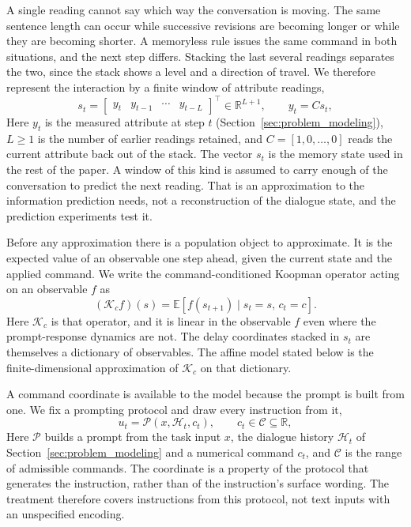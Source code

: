 A single reading cannot say which way the conversation is moving. The same
sentence length can occur while successive revisions are becoming longer or
while they are becoming shorter. A memoryless rule issues the same command in
both situations, and the next step differs. Stacking the last several readings
separates the two, since the stack shows a level and a direction of travel. We
therefore represent the interaction by a finite window of attribute readings,
\begin{equation}
    s_t=
    \begin{bmatrix}
        y_t & y_{t-1} & \cdots & y_{t-L}
    \end{bmatrix}^{\top}
    \in\mathbb{R}^{L+1},
    \qquad
    y_t=C s_t,
    \label{eq:memory_state}
\end{equation}
Here $y_t$ is the measured attribute at step $t$
(Section~\ref{sec:problem_modeling}), $L\geq 1$ is the number of earlier
readings retained, and $C=[1,0,\ldots,0]$ reads the current attribute back out
of the stack. The vector $s_t$ is the memory state used in the rest of the
paper. A window of this kind is assumed to carry enough of the conversation to
predict the next reading. That is an approximation to the information
prediction needs, not a reconstruction of the dialogue state, and the
prediction experiments test it.

Before any approximation there is a population object to approximate. It is
the expected value of an observable one step ahead, given the current state
and the applied command. We write the command-conditioned Koopman operator
acting on an observable $f$ as
\begin{equation}
    (\mathcal{K}_{c}f)(s)
    =
    \mathbb{E}\!\left[
        f(s_{t+1})
        \mid s_t=s,\,c_t=c
    \right].
    \label{eq:koopman_operator}
\end{equation}
Here $\mathcal{K}_{c}$ is that operator, and it is linear in the observable
$f$ even where the prompt-response dynamics are not. The delay coordinates
stacked in $s_t$ are themselves a dictionary of observables. The affine model
stated below is the finite-dimensional approximation of $\mathcal{K}_{c}$ on
that dictionary.

A command coordinate is available to the model because the prompt is built
from one. We fix a prompting protocol and draw every instruction from it,
\begin{equation}
    u_t=\mathcal{P}(x,\mathcal{H}_t,c_t),
    \qquad
    c_t\in\mathcal{C}\subseteq\mathbb{R},
    \label{eq:prompt_protocol}
\end{equation}
Here $\mathcal{P}$ builds a prompt from the task input $x$, the dialogue
history $\mathcal{H}_t$ of Section~\ref{sec:problem_modeling} and a numerical
command $c_t$, and $\mathcal{C}$ is the range of admissible commands. The
coordinate is a property of the protocol that generates the instruction,
rather than of the instruction's surface wording. The treatment therefore
covers instructions from this protocol, not text inputs with an unspecified
encoding.

